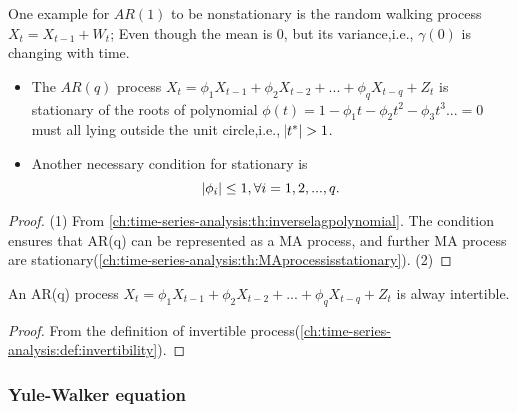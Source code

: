 \begin{remark}
One example for $AR(1)$ to be nonstationary is the random walking process $X_t = X_{t-1} + W_t$; Even though the mean is 0, but its variance,i.e., $\gamma(0)$ is changing with time.
\end{remark}


\begin{lemma}\label{ch:time-series-analysis:th:ARstationarycondition}
\cite[54]{box2015time} \hfill
\begin{itemize}
	\item The $AR(q)$ process $X_t = \phi_1 X_{t-1} + \phi_2 X_{t-2} + ... + \phi_q X_{t-q} + Z_t$ is stationary of the roots of polynomial $\phi(t) = 1-\phi_1 t - \phi_2 t^2 - \phi_3 t^3 ... = 0$ must all lying outside the unit circle,i.e., $\abs{t^*} > 1$.
	\item Another necessary condition for stationary is
	$$\abs{\phi_i}\leq 1, \forall i=1,2,...,q.$$
\end{itemize}
\end{lemma}
\begin{proof}
(1)	
From \autoref{ch:time-series-analysis:th:inverselagpolynomial}. The condition ensures that AR(q) can be represented as a MA process, and further MA process are stationary(\autoref{ch:time-series-analysis:th:MAprocessisstationary}).
(2) 
\end{proof}
 


\begin{lemma}
\cite[57]{box2015time}An AR(q) process $X_t = \phi_1 X_{t-1} + \phi_2 X_{t-2} + ... + \phi_q X_{t-q} + Z_t$ is alway intertible.
\end{lemma}
\begin{proof}
From the definition of invertible process(\autoref{ch:time-series-analysis:def:invertibility}).
\end{proof}


\subsubsection{Yule-Walker equation}

